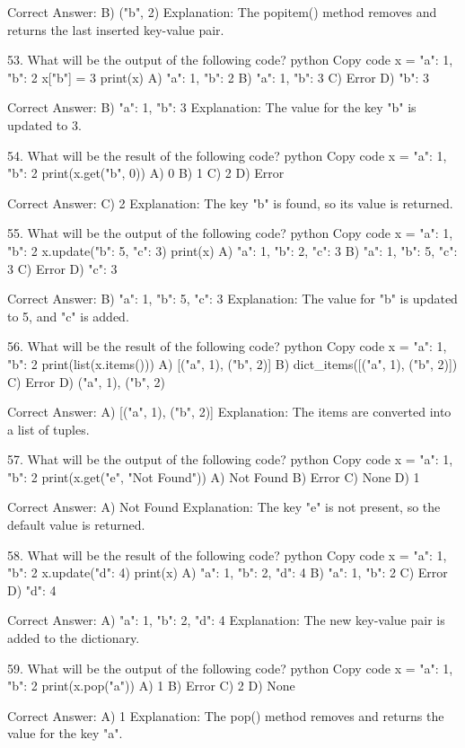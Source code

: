 Correct Answer: B) ("b", 2)
Explanation: The popitem() method removes and returns the last inserted key-value pair.

53. What will be the output of the following code?
python
Copy code
x = {"a": 1, "b": 2}
x["b"] = 3
print(x)
A) {"a": 1, "b": 2}
B) {"a": 1, "b": 3}
C) Error
D) {"b": 3}

Correct Answer: B) {"a": 1, "b": 3}
Explanation: The value for the key "b" is updated to 3.

54. What will be the result of the following code?
python
Copy code
x = {"a": 1, "b": 2}
print(x.get("b", 0))
A) 0
B) 1
C) 2
D) Error

Correct Answer: C) 2
Explanation: The key "b" is found, so its value is returned.

55. What will be the output of the following code?
python
Copy code
x = {"a": 1, "b": 2}
x.update({"b": 5, "c": 3})
print(x)
A) {"a": 1, "b": 2, "c": 3}
B) {"a": 1, "b": 5, "c": 3}
C) Error
D) {"c": 3}

Correct Answer: B) {"a": 1, "b": 5, "c": 3}
Explanation: The value for "b" is updated to 5, and "c" is added.

56. What will be the result of the following code?
python
Copy code
x = {"a": 1, "b": 2}
print(list(x.items()))
A) [("a", 1), ("b", 2)]
B) dict_items([("a", 1), ("b", 2)])
C) Error
D) {("a", 1), ("b", 2)}

Correct Answer: A) [("a", 1), ("b", 2)]
Explanation: The items are converted into a list of tuples.

57. What will be the output of the following code?
python
Copy code
x = {"a": 1, "b": 2}
print(x.get("e", "Not Found"))
A) Not Found
B) Error
C) None
D) 1

Correct Answer: A) Not Found
Explanation: The key "e" is not present, so the default value is returned.

58. What will be the result of the following code?
python
Copy code
x = {"a": 1, "b": 2}
x.update({"d": 4})
print(x)
A) {"a": 1, "b": 2, "d": 4}
B) {"a": 1, "b": 2}
C) Error
D) {"d": 4}

Correct Answer: A) {"a": 1, "b": 2, "d": 4}
Explanation: The new key-value pair is added to the dictionary.

59. What will be the output of the following code?
python
Copy code
x = {"a": 1, "b": 2}
print(x.pop("a"))
A) 1
B) Error
C) 2
D) None

Correct Answer: A) 1
Explanation: The pop() method removes and returns the value for the key "a".

